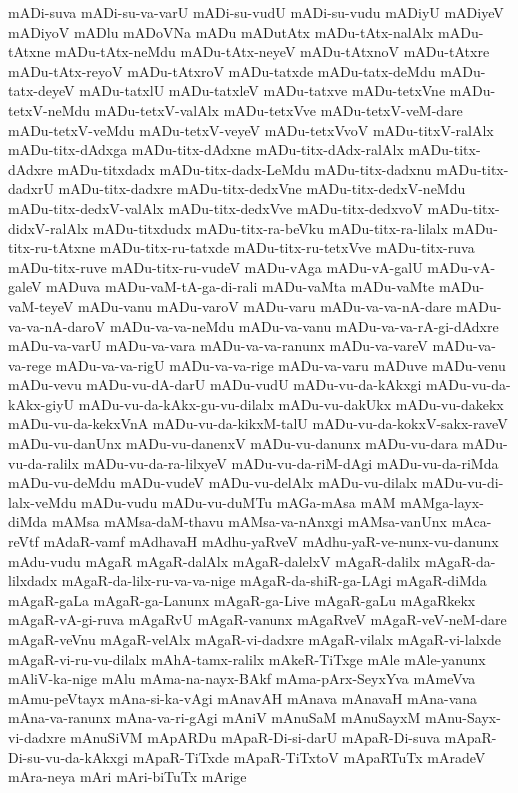 {mADi-suva
mADi-su-va-varU
mADi-su-vudU
mADi-su-vudu
mADiyU
mADiyeV
mADiyoV
mADlu
mADoVNa
mADu
mADutAtx
mADu-tAtx-nalAlx
mADu-tAtxne
mADu-tAtx-neMdu
mADu-tAtx-neyeV
mADu-tAtxnoV
mADu-tAtxre
mADu-tAtx-reyoV
mADu-tAtxroV
mADu-tatxde
mADu-tatx-deMdu
mADu-tatx-deyeV
mADu-tatxlU
mADu-tatxleV
mADu-tatxve
mADu-tetxVne
mADu-tetxV-neMdu
mADu-tetxV-valAlx
mADu-tetxVve
mADu-tetxV-veM-dare
mADu-tetxV-veMdu
mADu-tetxV-veyeV
mADu-tetxVvoV
mADu-titxV-ralAlx
mADu-titx-dAdxga
mADu-titx-dAdxne
mADu-titx-dAdx-ralAlx
mADu-titx-dAdxre
mADu-titxdadx
mADu-titx-dadx-LeMdu
mADu-titx-dadxnu
mADu-titx-dadxrU
mADu-titx-dadxre
mADu-titx-dedxVne
mADu-titx-dedxV-neMdu
mADu-titx-dedxV-valAlx
mADu-titx-dedxVve
mADu-titx-dedxvoV
mADu-titx-didxV-ralAlx
mADu-titxdudx
mADu-titx-ra-beVku
mADu-titx-ra-lilalx
mADu-titx-ru-tAtxne
mADu-titx-ru-tatxde
mADu-titx-ru-tetxVve
mADu-titx-ruva
mADu-titx-ruve
mADu-titx-ru-vudeV
mADu-vAga
mADu-vA-galU
mADu-vA-galeV
mADuva
mADu-vaM-tA-ga-di-rali
mADu-vaMta
mADu-vaMte
mADu-vaM-teyeV
mADu-vanu
mADu-varoV
mADu-varu
mADu-va-va-nA-dare
mADu-va-va-nA-daroV
mADu-va-va-neMdu
mADu-va-vanu
mADu-va-va-rA-gi-dAdxre
mADu-va-varU
mADu-va-vara
mADu-va-va-ranunx
mADu-va-vareV
mADu-va-va-rege
mADu-va-va-rigU
mADu-va-va-rige
mADu-va-varu
mADuve
mADu-venu
mADu-vevu
mADu-vu-dA-darU
mADu-vudU
mADu-vu-da-kAkxgi
mADu-vu-da-kAkx-giyU
mADu-vu-da-kAkx-gu-vu-dilalx
mADu-vu-dakUkx
mADu-vu-dakekx
mADu-vu-da-kekxVnA
mADu-vu-da-kikxM-talU
mADu-vu-da-kokxV-sakx-raveV
mADu-vu-danUnx
mADu-vu-danenxV
mADu-vu-danunx
mADu-vu-dara
mADu-vu-da-ralilx
mADu-vu-da-ra-lilxyeV
mADu-vu-da-riM-dAgi
mADu-vu-da-riMda
mADu-vu-deMdu
mADu-vudeV
mADu-vu-delAlx
mADu-vu-dilalx
mADu-vu-di-lalx-veMdu
mADu-vudu
mADu-vu-duMTu
mAGa-mAsa
mAM
mAMga-layx-diMda
mAMsa
mAMsa-daM-thavu
mAMsa-va-nAnxgi
mAMsa-vanUnx
mAca-reVtf
mAdaR-vamf
mAdhavaH
mAdhu-yaRveV
mAdhu-yaR-ve-nunx-vu-danunx
mAdu-vudu
mAgaR
mAgaR-dalAlx
mAgaR-dalelxV
mAgaR-dalilx
mAgaR-da-lilxdadx
mAgaR-da-lilx-ru-va-va-nige
mAgaR-da-shiR-ga-LAgi
mAgaR-diMda
mAgaR-gaLa
mAgaR-ga-Lanunx
mAgaR-ga-Live
mAgaR-gaLu
mAgaRkekx
mAgaR-vA-gi-ruva
mAgaRvU
mAgaR-vanunx
mAgaRveV
mAgaR-veV-neM-dare
mAgaR-veVnu
mAgaR-velAlx
mAgaR-vi-dadxre
mAgaR-vilalx
mAgaR-vi-lalxde
mAgaR-vi-ru-vu-dilalx
mAhA-tamx-ralilx
mAkeR-TiTxge
mAle
mAle-yanunx
mAliV-ka-nige
mAlu
mAma-na-nayx-BAkf
mAma-pArx-SeyxYva
mAmeVva
mAmu-peVtayx
mAna-si-ka-vAgi
mAnavAH
mAnava
mAnavaH
mAna-vana
mAna-va-ranunx
mAna-va-ri-gAgi
mAniV
mAnuSaM
mAnuSayxM
mAnu-Sayx-vi-dadxre
mAnuSiVM
mApARDu
mApaR-Di-si-darU
mApaR-Di-suva
mApaR-Di-su-vu-da-kAkxgi
mApaR-TiTxde
mApaR-TiTxtoV
mApaRTuTx
mAradeV
mAra-neya
mAri
mAri-biTuTx
mArige
}
